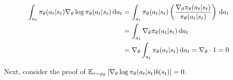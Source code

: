 \documentclass{article}
\begin{document}
\begin{tcolorbox}[breakable,enhanced,colback=gray!10!white,colframe=gray!50!black,
title={}]
\begin{align*}
\int_{a_t} \pi_\theta(a_t \vert s_t) \nabla_\theta \log \pi_\theta(a_t \vert s_t) \, {\rm d}a_t &= \int_{a_t} \pi_\theta(a_t \vert s_t) \left(\frac{\nabla_\theta \pi_\theta(a_t \vert s_t)}{\pi_\theta(a_t \vert s_t)}\right) \, {\rm d}a_t \\
&= \int_{a_t} \nabla_\theta \pi_\theta(a_t \vert s_t) \, {\rm d}a_t \\
&= \nabla_\theta \int_{a_t} \pi_\theta(a_t \vert s_t) \, {\rm d}a_t = \nabla_\theta \cdot 1 = 0
\end{align*}
\end{tcolorbox}
Next, consider the proof of ${\mathbb E}_{\tau \sim p_\theta} \left[\nabla_\theta \log \pi_\theta(a_t \vert s_t) b(s_t)\right] = 0$.
\end{document}
